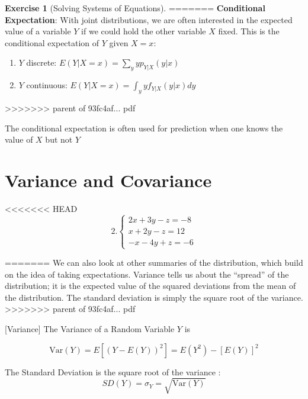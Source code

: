 \documentclass[]{book}
\providecommand{\tightlist}{%
  \setlength{\itemsep}{0pt}\setlength{\parskip}{0pt}}
\theoremstyle{definition}
\theoremstyle{definition}
\theoremstyle{definition}
\newtheorem{exercise}{Exercise}[chapter]
\theoremstyle{remark}
\begin{document}
\begin{exercise}[Solving Systems of Equations]
\protect\hypertarget{exr:solvesys1}{}{\label{exr:solvesys1} {} }
=======
\textbf{Conditional Expectation}: With joint distributions, we are often interested in the expected value of a variable \(Y\) if we could hold the other variable \(X\) fixed. This is the conditional expectation of \(Y\) given \(X = x\):

\begin{enumerate}
\def\labelenumi{\arabic{enumi}.}
\tightlist
\item
  \(Y\) discrete: \(E(Y|X = x) = \sum_y yp_{Y|X}(y|x)\)
\item
  \(Y\) continuous: \(E(Y|X = x) = \int_y yf_{Y|X}(y|x)dy\)
\end{enumerate}
>>>>>>> parent of 93fc4af... pdf

The conditional expectation is often used for prediction when one knows the value of \(X\) but not \(Y\)

\hypertarget{variance-and-covariance}{%
\section{Variance and Covariance}\label{variance-and-covariance}}

<<<<<<< HEAD
\[
  2. \begin{cases}
               2x + 3y - z = -8\\
               x + 2y - z = 12\\
             -x -4y + z = -6
            \end{cases}
               \]
\end{exercise}
=======
We can also look at other summaries of the distribution, which build on the idea of taking expectations. Variance tells us about the ``spread'' of the distribution; it is the expected value of the squared deviations from the mean of the distribution. The standard deviation is simply the square root of the variance.
>>>>>>> parent of 93fc4af... pdf

[Variance]
\protect\hypertarget{def:unnamed-chunk-84}{}{\label{def:unnamed-chunk-84} {} }The Variance of a Random Variable \(Y\) is

\[\text{Var}(Y) = E[(Y - E(Y))^2] =  E(Y^2)-[E(Y)]^2\]

The Standard Deviation is the square root of the variance : \[SD(Y) = \sigma_Y= \sqrt{\text{Var}(Y)}\]
\end{document}
